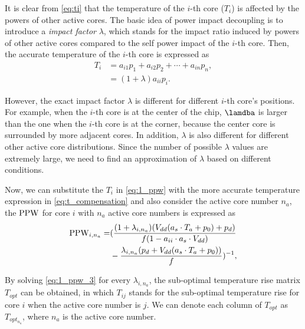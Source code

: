 It is clear from \eqref{eq:ti} that the temperature of the $i$-th core
($T_i$) is affected by the powers of
other active cores. 
The basic idea of power impact decoupling is to introduce a
\emph{impact factor} $\lambda$, which stands for the
impact ratio induced by powers of 
other active cores compared to the self power impact of the $i$-th core. Then, the accurate temperature of the $i$-th core is expressed as
\begin{equation}\label{eq:t_compensation}
\begin{split}
T_{i} &=a_{i1}p_{1} + a_{i2}p_{2} +\cdots + a_{in}p_{n},\\
&=(1+\lambda)a_{ii}p_{i}.
\end{split}
\end{equation}

However, the exact impact factor $\lambda$ is different for different
$i$-th core's positions. For example, when
the $i$-th core is at the center of the chip, $\lamdba$ is larger than
the one when the $i$-th core is at the corner, because the
center core is surrounded by more adjacent cores.  In addition,
$\lambda$ is also different for different other active core
distributions. Since the number of
possible $\lambda$ values are extremely large, we need to find an
approximation of $\lambda$ based on different conditions. 

Now, we can substitute the $T_{i}$
in \eqref{eq:1_ppw} with the more accurate temperature expression in
\eqref{eq:t_compensation} and also consider the active core number
$n_a$, the $\operatorname{PPW}$ for core $i$ with $n_a$ active core numbers is
expressed as
\begin{equation}\label{eq:1_ppw_3}
\begin{split}
\ppw_{i,n_a} =& ( \frac{(1+\lambda_{i,n_a})(V_{dd}(a_{s}\cdot T_{a}+p_{0})+p_{d})}{f(1-a_{ii} \cdot a_{s} \cdot V_{dd})}\\
&-\frac{\lambda_{i,n_a} (p_{d}+V_{dd}(a_{s}\cdot T_{a}+p_{0}))}{f} ) ^{-1},
\end{split}
\end{equation}

By solving \eqref{eq:1_ppw_3} for every $\lambda_{i,n_a}$, the sub-optimal temperature rise matrix $T_{opt}$ can be obtained, in which $T_{ij}$ stands for the sub-optimal temperature rise for core $i$ when the active core number is $j$. We can denote each column of $T_{opt}$ as $T_{opt_{n_{a}}}$, where $n_{a}$ is the active core number. 

